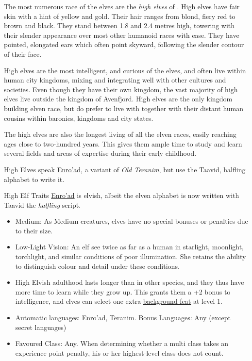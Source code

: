 The most numerous race of the elves are the \emph{high elves} of
. High elves have fair skin with a hint of yellow and
gold. Their hair ranges from blond, fiery red to brown and black. They stand
between 1.8 and 2.4 metres high, towering with their slender appearance over
most other humanoid races with ease. They have pointed, elongated ears which
often point skyward, following the slender contour of their face.

High elves are the most intelligent, and curious of the elves, and often live
within human city kingdoms, mixing and integrating well with other cultures
and societies. Even though they have their own kingdom, the vast majority of
high elves live outside the kingdom of Avenfjord. High elves are the only
kingdom building elven race, but do prefer to live with together with their
distant human cousins within baronies, kingdoms and city states.

The high elves are also the longest living of all the elven races, easily
reaching ages close to two-hundred years. This gives them ample time to study
and learn several fields and areas of expertise during their early childhood.

High Elves speak \hyperref[sec:Speak Language]{Enro'ad}, a variant of
\emph{Old Teranim}, but use the Taavid, halfling alphabet to write it.

\begin{35e}{High Elf Traits}
  \hyperref[sec:Speak Language]{Enro'ad} is elvish, albeit the elven alphabet
  is now written with Taavid the \emph{halfling} script.

  \begin{itemize}[noitemsep]
    \item Medium: As Medium creatures, elves have no special bonuses or
      penalties due to their size.
    \item Low-Light Vision: An elf see twice as far as a human in starlight,
      moonlight, torchlight, and similar conditions of poor illumination. She
      retains the ability to distinguish colour and detail under these
      conditions.
    \item High Elvish adulthood lasts longer than in other species, and they
      thus have more time to learn while they grow up. This grants them a +2
      bonus to intelligence, and elves can select one extra
      \hyperref[sec:Background Feats]{background feat} at level 1.
    \item Automatic languages: Enro'ad, Teranim. Bonus Languages: Any (except
      secret languages)
    \item Favoured Class: Any. When determining whether a multi class takes an
      experience point penalty, his or her highest-level class does not count.
  \end{itemize}
\end{35e}

